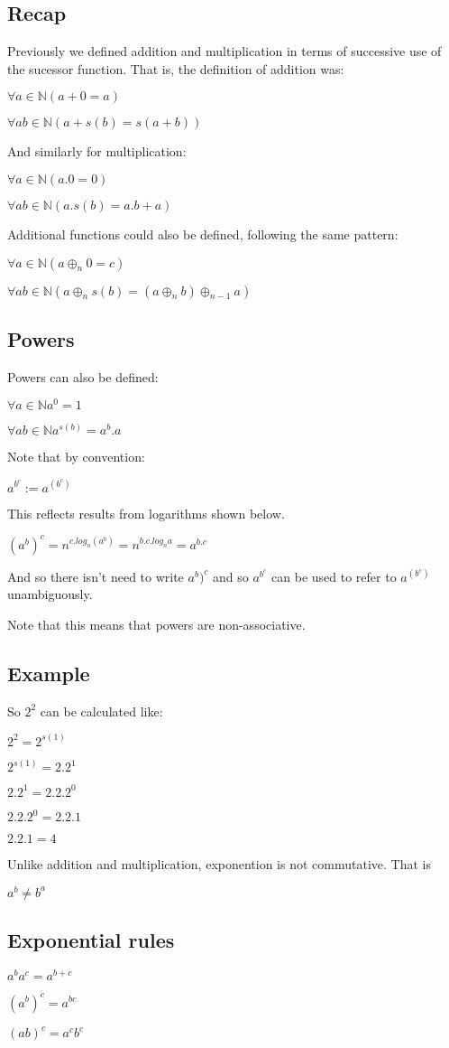 \subsection{Recap}

Previously we defined addition and multiplication in terms of successive use of the sucessor function. That is, the definition of addition was:

\(\forall a \in \mathbb{N} (a+0=a)\)

\(\forall a b \in \mathbb{N} (a+s(b)=s(a+b))\)

And similarly for multiplication:

\(\forall a \in \mathbb{N} (a.0=0)\)

\(\forall a b \in \mathbb{N} (a.s(b)=a.b+a)\)

Additional functions could also be defined, following the same pattern:

\(\forall a \in \mathbb{N} (a\oplus _n 0=c)\)

\(\forall a b \in \mathbb{N} (a\oplus _{n} s(b)=(a\oplus_{n} b)\oplus_{n-1}a)\)

\subsection{Powers}

Powers can also be defined:

\(\forall a \in \mathbb{N} a^0=1\)

\(\forall a b \in \mathbb{N} a^{s(b)}=a^b.a\)

Note that by convention:

\(a^{b^c}:=a^{(b^c)}\)

This reflects results from logarithms shown below.

\((a^b)^c=n^{c.log_n(a^b)} = n^{b.c.log_n {a}} = a^{b.c}\)

And so there isn't need to write \(a^b)^c\) and so \(a^{b^c}\) can be used to refer to \(a^{(b^c)}\) unambiguously.

Note that this means that powers are non-associative.

\subsection{Example}

So \(2^2\) can be calculated like:

\(2^2=2^{s(1)}\)

\(2^{s(1)}=2.2^1\)

\(2.2^1=2.2.2^0\)

\(2.2.2^0=2.2.1\)

\(2.2.1=4\)

Unlike addition and multiplication, exponention is not commutative. That is

\(a^b\ne b^a\)

\subsection{Exponential rules}

\(a^ba^c=a^{b+c}\)

\((a^b)^c=a^{bc}\)

\((ab)^c=a^cb^c\)

